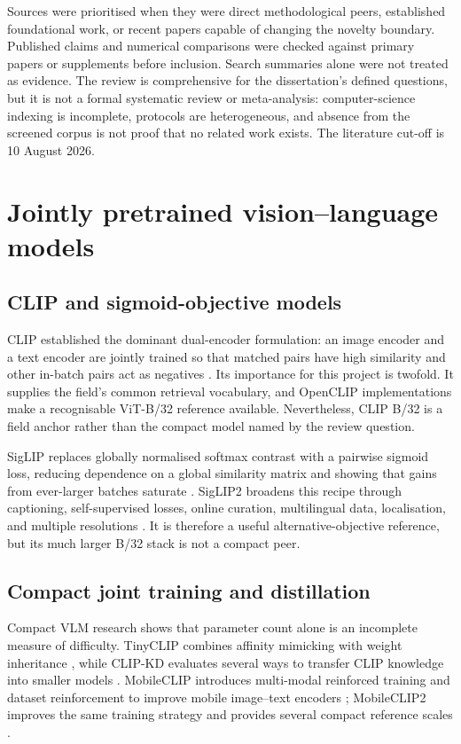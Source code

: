 Sources were prioritised when they were direct methodological peers, established
foundational work, or recent papers capable of changing the novelty boundary.
Published claims and numerical comparisons were checked against primary papers
or supplements before inclusion. Search summaries alone were not treated as
evidence. The review is comprehensive for the dissertation's defined questions,
but it is not a formal systematic review or meta-analysis: computer-science
indexing is incomplete, protocols are heterogeneous, and absence from the
screened corpus is not proof that no related work exists. The literature cut-off
is 10 August 2026.

\section{Jointly pretrained vision--language models}

\subsection{CLIP and sigmoid-objective models}

CLIP established the dominant dual-encoder formulation: an image encoder and a
text encoder are jointly trained so that matched pairs have high similarity and
other in-batch pairs act as negatives \cite{radford2021clip}. Its importance for
this project is twofold. It supplies the field's common retrieval vocabulary,
and OpenCLIP implementations make a recognisable ViT-B/32 reference available.
Nevertheless, CLIP B/32 is a field anchor rather than the compact model named by
the review question.

SigLIP replaces globally normalised softmax contrast with a pairwise sigmoid
loss, reducing dependence on a global similarity matrix and showing that gains
from ever-larger batches saturate \cite{zhai2023siglip}. SigLIP2 broadens this
recipe through captioning, self-supervised losses, online curation, multilingual
data, localisation, and multiple resolutions \cite{tschannen2025siglip2}. It is
therefore a useful alternative-objective reference, but its much larger B/32
stack is not a compact peer.

\subsection{Compact joint training and distillation}

Compact VLM research shows that parameter count alone is an incomplete measure
of difficulty. TinyCLIP combines affinity mimicking with weight inheritance
\cite{wu2023tinyclip}, while CLIP-KD evaluates several ways to transfer CLIP
knowledge into smaller models \cite{yang2024clipkd}. MobileCLIP introduces
multi-modal reinforced training and dataset reinforcement to improve mobile
image--text encoders \cite{vasu2024mobileclip}; MobileCLIP2 improves the same
training strategy and provides several compact reference scales
\cite{faghri2025mobileclip2}.

